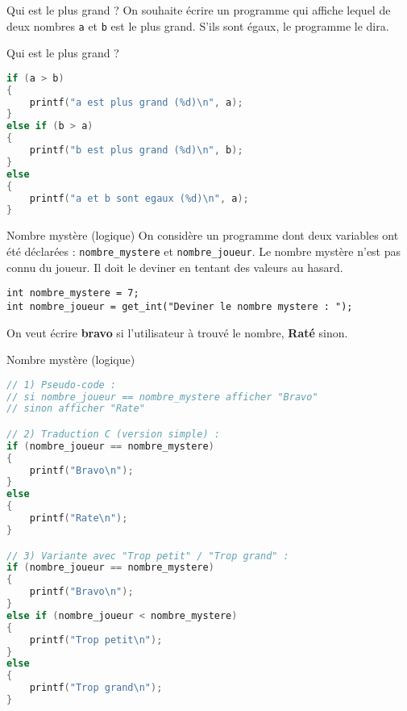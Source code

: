 \begin{UPSTIexercice}{Qui est le plus grand ?}
    On souhaite écrire un programme qui affiche lequel de deux nombres \verb|a| et \verb|b| est le plus grand. S'ils sont égaux, le programme le dira.
\end{UPSTIexercice}

\begin{UPSTIprofOnlyEnv}
    \begin{UPSTIcorrectionP}{Qui est le plus grand ?}
        \begin{lstlisting}[language=C]
if (a > b)
{
    printf("a est plus grand (%d)\n", a);
}
else if (b > a)
{
    printf("b est plus grand (%d)\n", b);
}
else
{
    printf("a et b sont egaux (%d)\n", a);
}
        \end{lstlisting}
    \end{UPSTIcorrectionP}
\end{UPSTIprofOnlyEnv}


\begin{UPSTIexercice}{Nombre mystère (logique)}
    On considère un programme dont deux variables ont été déclarées : \verb|nombre_mystere| et \verb|nombre_joueur|. Le nombre mystère n'est pas connu du joueur. Il doit le deviner en tentant des valeurs au hasard.
    \begin{lstlisting}
int nombre_mystere = 7; 
int nombre_joueur = get_int("Deviner le nombre mystere : ");
    \end{lstlisting}
    On veut écrire \textbf{bravo} si l'utilisateur à trouvé le nombre, \textbf{Raté} sinon.
\end{UPSTIexercice}

\begin{UPSTIprofOnlyEnv}
    \begin{UPSTIcorrectionP}{Nombre mystère (logique)}
        \begin{lstlisting}[language=C]
// 1) Pseudo-code :
// si nombre_joueur == nombre_mystere afficher "Bravo"
// sinon afficher "Rate"

// 2) Traduction C (version simple) :
if (nombre_joueur == nombre_mystere)
{
    printf("Bravo\n");
}
else
{
    printf("Rate\n");
}

// 3) Variante avec "Trop petit" / "Trop grand" :
if (nombre_joueur == nombre_mystere)
{
    printf("Bravo\n");
}
else if (nombre_joueur < nombre_mystere)
{
    printf("Trop petit\n");
}
else
{
    printf("Trop grand\n");
}
        \end{lstlisting}
    \end{UPSTIcorrectionP}
\end{UPSTIprofOnlyEnv}
